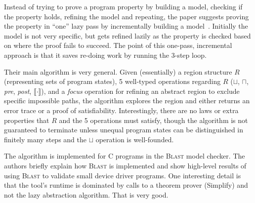 \documentclass{article}
\begin{document}
\onehalfspacing

Instead of trying to prove a program property by building a model, checking if the property holds, refining the model and repeating,
 the paper suggests proving the property in ``one'' lazy pass by incrementally building a model~\cite{hjms-lazy}.
Initially the model is not very specific, but gets refined lazily as the property is checked based on where the proof fails to succeed.
The point of this one-pass, incremental approach is that it saves re-doing work by running the 3-step loop.

Their main algorithm is very general.
Given (essentially) a region structure $R$ (representing sets of program states),
 5 well-typed operations regarding $R$ ($\sqcup$, $\sqcap$, \emph{pre}, \emph{post}, $\llbracket\cdot\rrbracket$),
 and a \emph{focus} operation for refining an abstract region to exclude specific impossible paths,
 the algorithm explores the region and either returns an error trace or a proof of satisfiability.
Interestingly, there are no laws or extra properties that $R$ and the 5 operations
 must satisfy, though the algorithm is not guaranteed to terminate unless unequal
 program states can be distinguished in finitely many steps and the $\sqcup$
 operation is well-founded.

The algorithm is implemented for C programs in the \textsc{Blast} model checker.
The authors briefly explain how \textsc{Blast} is implemented and show
 high-level results of using \textsc{Blast} to validate small device driver programs.
One interesting detail is that the tool's runtime is dominated by calls to a
 theorem prover (Simplify) and not the lazy abstraction algorithm.
That is very good.




\footnotesize


\end{document}
